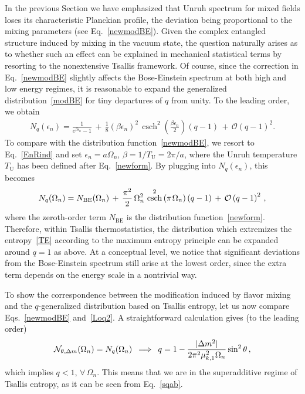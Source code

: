 \documentclass[floats,prd,aps,amssymb,nofootinbib,showkeys]{revtex4}
\DeclareMathOperator{\csch}{csch}
\newcommand{\be}{\begin{equation}}\newcommand{\ee}{\end{equation}}
\begin{document}
In the previous Section we have emphasized
that Unruh spectrum for mixed fields loses its 
characteristic Planckian profile, the deviation
being proportional to the mixing parameters
(see Eq.~\eqref{newmodBE}). Given the complex
entangled structure induced by mixing in the vacuum state, 
the question naturally arises as to whether such an effect 
can be explained in mechanical statistical terms
by resorting to the nonextensive Tsallis framework.
Of course, since the correction in Eq.~\eqref{newmodBE} slightly affects the Bose-Einstein spectrum at both high and low energy regimes, 
it is reasonable to expand the generalized 
distribution~\eqref{modBE} for tiny departures 
of $q$ from unity. To the leading order, we obtain
\begin{eqnarray}
\label{Loq}
N_q(\epsilon_n)=\frac{1}{e^{\beta \epsilon_n}-1}\,+\,\frac{1}{8}\left(\beta \epsilon_n\right)^2\,\csch^2\left(\frac{\beta \epsilon_n}{2}\right)\left(q-1\right)\,+\,\mathcal{O}\left(q-1\right)^2.
\end{eqnarray}
To compare with the distribution function~\eqref{newmodBE}, 
we resort to Eq.~\eqref{EnRind} and set $\epsilon_n=a\Omega_n$, 
$\beta=1/T_{\mathrm{U}}=2\pi/a$, where
the Unruh temperature $T_{\mathrm{U}}$ has been
defined after Eq.~\eqref{newform}. By plugging into 
$N_q(\epsilon_n)$, this becomes
\be
\label{Loq2}
N_{q}(\Omega_n)=N_{\mathrm{BE}}(\Omega_n)\,+\,\frac{\pi^2}{2}\,\Omega_n^2\,\csch^2\left(\pi\hspace{0.3mm}\Omega_n\right)\left(q-1\right)\,+\,\mathcal{O}\left(q-1\right)^2\,,
\ee
where the zeroth-order term $N_{\mathrm{BE}}$
is the distribution function~\eqref{newform}.
Therefore, within Tsallis thermostatistics, the 
distribution which extremizes the entropy~\eqref{TE}
according to the maximum entropy principle 
can be expanded around $q=1$ as above. 
At a conceptual level, we notice that 
significant deviations from the Bose-Einstein
spectrum still arise at the lowest order, since
the extra term depends on the energy
scale in a nontrivial way. 

To show the correspondence between
the modification induced by flavor mixing
and the $q$-generalized distribution based on 
Tsallis entropy, let us now compare 
Eqs.~\eqref{newmodBE} and~\eqref{Loq2}. 
A straightforward calculation gives (to the leading order)
\be
\mathcal{N}_{\theta,\Delta m}(\Omega_n)=N_{q}(\Omega_n) \,\,\,\Longrightarrow\,\,\, q=1-\frac{|\Delta m^2|}{2\pi^2\mu_{k,1}^{\hspace{0.1mm}2}\hspace{0.1mm}\Omega_n }\sin^2\theta\,, 
\label{q1}
\ee
which implies $q<1$, $\forall \, \Omega_n$. This means that we are in the superadditive regime of 
Tsallis entropy, as it can be seen from Eq.~\eqref{sqab}. 
\end{document}
